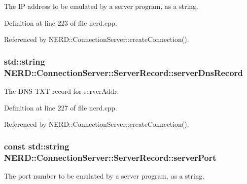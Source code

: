 \-The \-I\-P address to be emulated by a server program, as a string. 



\-Definition at line 223 of file nerd.\-cpp.



\-Referenced by \-N\-E\-R\-D\-::\-Connection\-Server\-::create\-Connection().

\hypertarget{structNERD_1_1ConnectionServer_1_1ServerRecord_a1272b0f4ca611ecc8c2b2b76c75c5f91}{
\subsubsection[{server\-Dns\-Record}]{\setlength{\rightskip}{0pt plus 5cm}std\-::string {\bf \-N\-E\-R\-D\-::\-Connection\-Server\-::\-Server\-Record\-::server\-Dns\-Record}}}
\label{structNERD_1_1ConnectionServer_1_1ServerRecord_a1272b0f4ca611ecc8c2b2b76c75c5f91}


\-The \-D\-N\-S \-T\-X\-T record for {\ttfamily server\-Addr}. 



\-Definition at line 227 of file nerd.\-cpp.



\-Referenced by \-N\-E\-R\-D\-::\-Connection\-Server\-::create\-Connection().

\hypertarget{structNERD_1_1ConnectionServer_1_1ServerRecord_a8eeda51ef462eeabb3d66b130fe70e56}{
\subsubsection[{server\-Port}]{\setlength{\rightskip}{0pt plus 5cm}const std\-::string {\bf \-N\-E\-R\-D\-::\-Connection\-Server\-::\-Server\-Record\-::server\-Port}}}
\label{structNERD_1_1ConnectionServer_1_1ServerRecord_a8eeda51ef462eeabb3d66b130fe70e56}


\-The port number to be emulated by a server program, as a string. 



